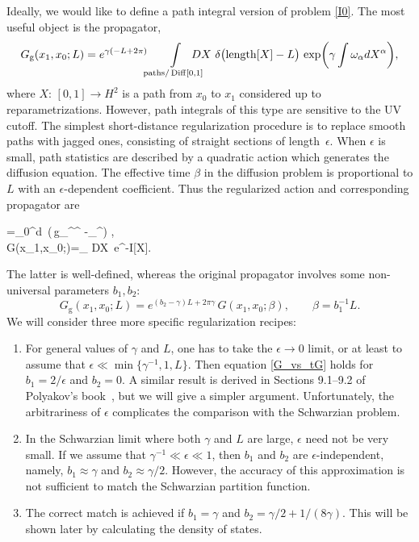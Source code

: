 \documentclass[11pt]{article}
\newcommand*{\widebox}[1]{\setlength{\fboxsep}{1ex}%
  \fbox{#1}}
\DeclareMathOperator{\Diff}{Diff}
\DeclareMathOperator{\HH}{H}
\DeclareMathOperator{\len}{length}
\newcommand{\g}{\text{g}}
\def\HH{H}
\begin{document}
Ideally, we would like to define a path integral version of problem \eqref{I0}. The most useful object is the propagator,
\begin{equation}\label{prop_I0}
G_{\g}(x_1,x_0;L)=
e^{\gamma(-L+2\pi)}\!\!\int\limits_{\text{paths}/\Diff[0,1]}\hspace{-0.5cm}
DX\,\,\delta\bigl(\len[X]-L\bigr)\,
\exp\biggl(\gamma\int\omega_{\alpha}dX^{\alpha}\biggr),
\end{equation}
where $X:\,[0,1]\to \HH^2$ is a path from $x_0$ to $x_1$ considered up to reparametrizations. However, path integrals of this type are sensitive to the UV cutoff. The simplest short-distance regularization procedure is to replace smooth paths with jagged ones, consisting of straight sections of length~$\epsilon$. When $\epsilon$ is small, path statistics are described by a quadratic action which generates the diffusion equation. The effective time $\beta$ in the diffusion problem is proportional to $L$ with an $\epsilon$-dependent coefficient. Thus the regularized action and corresponding propagator are
\begin{empheq}[box=\widebox]{gather}
\label{tI}
I[X]=\int_{0}^{\beta}d\tau\, 
\left(\,g_{\alpha\beta}^{\alpha}^{\beta}
-\gamma\omega_{\alpha}^{\alpha}\right) ,
\\[5pt]
G(x_1,x_0;\beta)=\int_{} DX\, e^{-I[X]}.
\end{empheq}
The latter is well-defined, whereas the original propagator involves some non-universal parameters $b_1,b_2$:
\begin{equation}\label{G_vs_tG}
G_{\g}(x_1,x_0;L)=e^{(b_{2}-\gamma)L+2\pi\gamma}\,G(x_1,x_0;\beta),\qquad
\beta=b_1^{-1}L.
\end{equation}
We will consider three more specific regularization recipes:
\begin{enumerate}
\item \label{reg1} For general values of $\gamma$ and $L$, one has to take the $\epsilon\to 0$ limit, or at least to assume that $\epsilon\ll\min\{\gamma^{-1},1,L\}$. Then equation \eqref{G_vs_tG} holds for $b_1=2/\epsilon$ and $b_2=0$. A similar result is derived in Sections 9.1--9.2 of Polyakov's book~\cite{Polyakov}, but we will give a simpler argument. Unfortunately, the arbitrariness of $\epsilon$ complicates the comparison with the Schwarzian problem.
\item \label{reg2} In the Schwarzian limit where both $\gamma$ and $L$ are large, $\epsilon$ need not be very small. If we assume that $\gamma^{-1}\ll\epsilon\ll 1$, then $b_1$ and $b_2$ are $\epsilon$-independent, namely, $b_1\approx\gamma$ and $b_2\approx\gamma/2$. However, the accuracy of this approximation is not sufficient to match the Schwarzian partition function.
\item \label{reg3} The correct match is achieved if $b_1=\gamma$ and $b_2=\gamma/2+1/(8\gamma)$. This will be shown later by calculating the density of states.
\end{enumerate}
\end{document}
